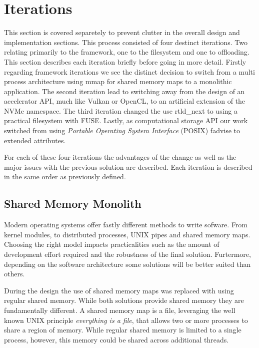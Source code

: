 \section{Iterations}

This section is covered separetely to prevent clutter in the overall design and
implementation sections. This process consisted of four destinct iterations.
Two relating primarily to the framework, one to the filesystem and one to
offloading. This section describes each iteration briefly before going in more
detail. Firstly regarding framework iterations we see the distinct decision
to switch from a multi process architecture using mmap for shared memory maps to
a monolithic application. The second iteration lead to switching away from the
design of an accelerator API, much like Vulkan \cite{vulkan} or OpenCL, to an
artificial extension of the NVMe namespace. The third iteration changed the use
rtld\_next \cite{rtldnext} to using a practical filesystem with FUSE. Lastly, as
computational storage API our work switched from using
\textit{Portable Operating System Interface} (POSIX) fadvise \cite{fadvise} to
extended attributes.

For each of these four iterations the advantages of the change as well as the
major issues with the previous solution are described. Each iteration is
described in the same order as previously defined.

\subsection{Shared Memory Monolith}

Modern operating systems offer fastly different methods to write sofware. From
kernel modules, to distributed processes, UNIX pipes and shared memory maps.
Choosing the right model impacts practicalities such as the amount of
development effort required and the robustness of the final solution. 
Furtermore, depending on the software architecture some solutions will be better
suited than others.

During the design the use of shared memory maps was replaced with using regular
shared memory. While both solutions provide shared memory they are fundamentally
different. A shared memory map is a file, leveraging the well known UNIX
principle \textit{everything is a file}, that allows two or more processes to
share a region of memory. While regular shared memory is limited to a single
process, however, this memory could be shared across additional threads.

